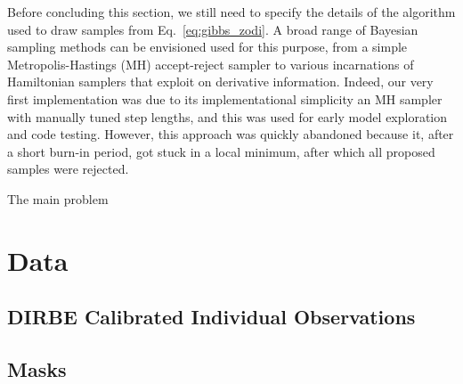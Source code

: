 \documentclass[twocolumn]{aa}
\begin{document}
Before concluding this section, we still need to specify the details
of the algorithm used to draw samples from
Eq.~\eqref{eq:gibbs_zodi}. A broad range of Bayesian sampling methods
can be envisioned used for this purpose, from a simple
Metropolis-Hastings (MH) accept-reject sampler to various incarnations
of Hamiltonian samplers that exploit on derivative
information. Indeed, our very first implementation was due to its
implementational simplicity an MH sampler with manually tuned step
lengths, and this was used for early model exploration and code
testing. However, this approach was quickly abandoned because it,
after a short burn-in period, got stuck in a local minimum, after
which all proposed samples were rejected.

The main problem


\section{Data}\label{sect:data}

\subsection{DIRBE Calibrated Individual Observations}

\subsection{Masks}
\end{document}
